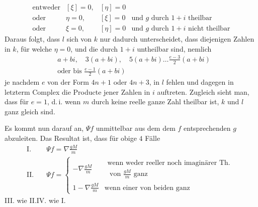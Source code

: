 \[
\begin{array}{llll}
\text{entweder}&[\xi]=0,&[\eta]=0&\\
\text{oder}&\eta=0,&[\xi]=0&\text{und }g\text{ durch }1+i\text{ theilbar}\\
\text{oder}&\xi=0,&[\eta]=0&\text{und }g\text{ durch }1+i\text{ nicht theilbar}
\end{array}
\]
Daraus folgt, dass $l$ sich von $k$ nur dadurch unterscheidet, dass diejenigen Zahlen in $k$, für welche $\eta=0$, und die durch $1+i$ untheilbar sind, nemlich
\[
\begin{aligned}
&a+bi,\quad3(a+bi),\quad5(a+bi)\ldots\frac{e-3}{2}(a+bi)\\
&\text{oder bis }\frac{e-1}{2}(a+bi)
\end{aligned}
\]
je nachdem $e$ von der Form $4n+1$ oder $4n+3$, in $l$ fehlen und dagegen in letzterm Complex die Producte jener Zahlen in $i$ auftreten. Zugleich sieht man, dass für $e=1$, d.\,i. wenn $m$ durch keine reelle ganze Zahl theilbar ist, $k$ und $l$ ganz gleich sind.

Es kommt nun darauf an, $\Psi f$ unmittelbar aus dem dem $f$ entsprechenden $g$ abzuleiten. Das Resultat ist, dass für obige $4$ Fälle
\[
\begin{aligned}
\mathrm{I.}\quad&\Psi f=\nabla\frac{gM}{m}\\
\mathrm{II.}\quad&\Psi f=\left\{\begin{array}{ll}
-\nabla\frac{gM}{m}&\begin{gathered}\text{wenn weder reeller noch imaginärer Th.}\\\text{ von }\frac{gM}{m}\text{ ganz}\end{gathered}\\
1-\nabla\frac{gM}{m}&\text{wenn einer von beiden ganz}
\end{array}\right.
\end{aligned}
\]
III. wie II.\quad IV. wie I.
